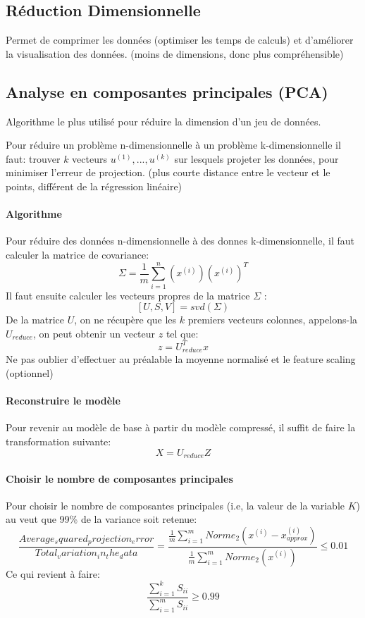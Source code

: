 \documentclass{article}
\theoremstyle{definition}
\begin{document}
\subsection{Réduction Dimensionnelle}
Permet de comprimer les données (optimiser les temps de calculs) et d'améliorer la visualisation des données. (moins de dimensions, donc plus compréhensible) \par
\subsection{Analyse en composantes principales (PCA)}
Algorithme le plus utilisé pour réduire la dimension d'un jeu de données.\par
Pour réduire un problème n-dimensionnelle à un problème k-dimensionnelle il faut: trouver $k$ vecteurs $u^{(1)},...,u^{(k)}$ sur lesquels projeter les données, pour minimiser l'erreur de projection. (plus courte distance entre le vecteur et le points, différent de la régression linéaire)
\paragraph{Algorithme} Pour réduire des données n-dimensionnelle à des donnes k-dimensionnelle, il faut calculer la matrice de covariance:
$$\Sigma = \frac{1}{m} \sum_{i=1}^{n}(x^{(i)})(x^{(i)})^T$$
Il faut ensuite calculer les vecteurs propres de la matrice $\Sigma$ :
$$[U,S,V] = svd(\Sigma)$$
De la matrice $U$, on ne récupère que les $k$ premiers vecteurs colonnes, appelons-la $U_{reduce}$, on peut obtenir un vecteur $z$ tel que:
$$z=U_{reduce}^Tx$$
Ne pas oublier d'effectuer au préalable la moyenne normalisé et le feature scaling (optionnel)
\paragraph{Reconstruire le modèle} Pour revenir au modèle de base à partir du modèle compressé, il suffit de faire la transformation suivante:
$$X= U_{reduce}Z$$
\paragraph{Choisir le nombre de composantes principales} Pour choisir le nombre de composantes principales (i.e, la valeur de la variable $K$) au veut que 99\% de la variance soit retenue:
$$\frac{Average_squared_projection_error}{Total_variation_in_the_data} = \frac{\frac{1}{m}\sum_{i=1}^{m}Norme_2(x^{(i)}-x_{approx}^{(i)})}{\frac{1}{m}\sum_{i=1}^{m}Norme_2(x^{(i)})} \leq 0.01$$
Ce qui revient à faire:
$$
\frac
{\sum_{i=1}^{k}S_{ii}}
{\sum_{i=1}^{m}S_{ii}}
\geq
0.99
$$
\newpage
\end{document}
